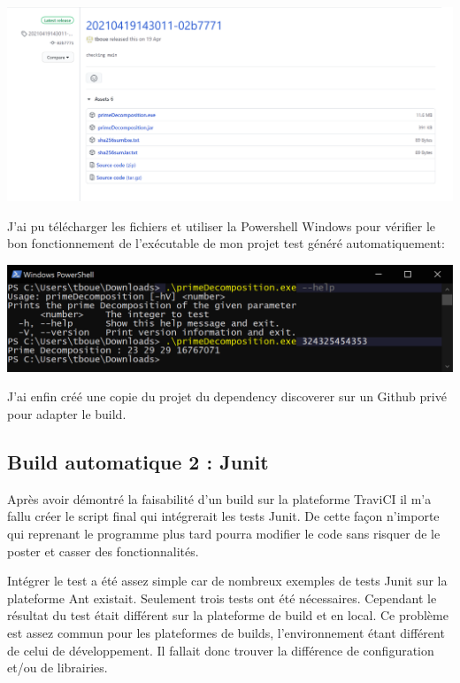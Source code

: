 \documentclass[french,a4paper,12pt]{report}
\begin{document}
\begin{center}
  \includegraphics[width=\textwidth]{ressources/images/github.png}
\end{center}

J'ai pu télécharger les fichiers et utiliser la Powershell Windows pour vérifier le bon fonctionnement de l’exécutable de mon projet test généré automatiquement:

\begin{center}
  \includegraphics[width=\textwidth]{ressources/images/exePrime.png}
\end{center}

J'ai enfin créé une copie du projet du dependency discoverer sur un Github privé pour adapter le build.

\subsection{Build automatique 2 : Junit}

Après avoir démontré la faisabilité d’un build sur la plateforme TraviCI il m’a fallu créer le script final qui intégrerait les tests Junit. De cette façon n’importe qui reprenant le programme plus tard pourra modifier le code sans risquer de le poster et casser des fonctionnalités.

Intégrer le test a été assez simple car de nombreux exemples de tests Junit sur la plateforme Ant existait. Seulement trois tests ont été nécessaires. Cependant le résultat du test était différent sur la plateforme de build et en local. Ce problème est assez commun pour les plateformes de builds, l’environnement étant différent de celui de développement. Il fallait donc trouver la différence de configuration et/ou de librairies.
\end{document}
